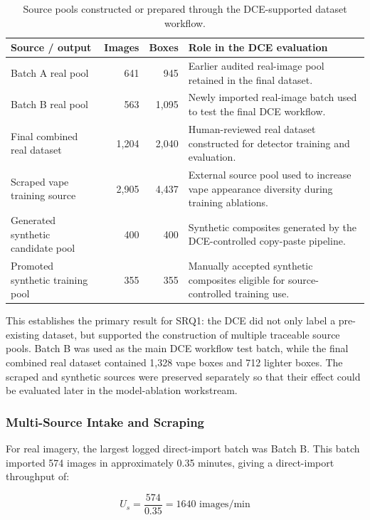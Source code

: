 \begin{table}[H]
\centering
\small
\renewcommand{\arraystretch}{1.2}
\begin{tabularx}{\textwidth}{p{} r r X}
\toprule
\textbf{Source / output} & \textbf{Images} & \textbf{Boxes} & \textbf{Role in the DCE evaluation} \\
\midrule
Batch A real pool & 641 & 945 & Earlier audited real-image pool retained in the final dataset. \\
Batch B real pool & 563 & 1,095 & Newly imported real-image batch used to test the final DCE workflow. \\
Final combined real dataset & 1,204 & 2,040 & Human-reviewed real dataset constructed for detector training and evaluation. \\
Scraped vape training source & 2,905 & 4,437 & External source pool used to increase vape appearance diversity during training ablations. \\
Generated synthetic candidate pool & 400 & 400 & Synthetic composites generated by the DCE-controlled copy-paste pipeline. \\
Promoted synthetic training pool & 355 & 355 & Manually accepted synthetic composites eligible for source-controlled training use. \\
\bottomrule
\end{tabularx}
\caption{Source pools constructed or prepared through the DCE-supported dataset workflow.}
\label{tab:dce_results_source_construction}
\end{table}

This establishes the primary result for SRQ1: the DCE did not only label a pre-existing dataset, but supported the construction of multiple traceable source pools. Batch B was used as the main DCE workflow test batch, while the final combined real dataset contained 1,328 vape boxes and 712 lighter boxes. The scraped and synthetic sources were preserved separately so that their effect could be evaluated later in the model-ablation workstream.

\subsubsection{Multi-Source Intake and Scraping}

For real imagery, the largest logged direct-import batch was Batch B. This batch imported 574 images in approximately 0.35 minutes, giving a direct-import throughput of:

\begin{equation}
U_s = \frac{574}{0.35} = 1640 \text{ images/min}
\end{equation}

